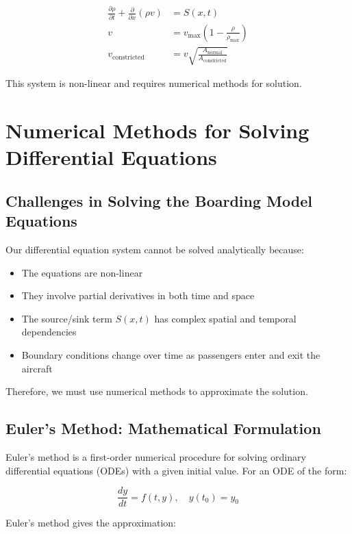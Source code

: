 \documentclass[a4paper,12pt]{article}
\begin{document}
\begin{align}
\frac{\partial \rho}{\partial t} + \frac{\partial}{\partial x}(\rho v) &= S(x,t) \\
v &= v_{\text{max}} \left(1 - \frac{\rho}{\rho_{\text{max}}}\right) \\
v_{\text{constricted}} &= v\sqrt{\frac{A_{\text{normal}}}{A_{\text{constricted}}}}
\end{align}

This system is non-linear and requires numerical methods for solution.

\section{Numerical Methods for Solving Differential Equations}

\subsection{Challenges in Solving the Boarding Model Equations}

Our differential equation system cannot be solved analytically because:
\begin{itemize}
    \item The equations are non-linear
    \item They involve partial derivatives in both time and space
    \item The source/sink term $S(x,t)$ has complex spatial and temporal dependencies
    \item Boundary conditions change over time as passengers enter and exit the aircraft
\end{itemize}

Therefore, we must use numerical methods to approximate the solution.

\subsection{Euler's Method: Mathematical Formulation}

Euler's method is a first-order numerical procedure for solving ordinary differential equations (ODEs) with a given initial value. For an ODE of the form:

\begin{equation}
\frac{dy}{dt} = f(t, y), \quad y(t_0) = y_0
\end{equation}

Euler's method gives the approximation:
\end{document}
